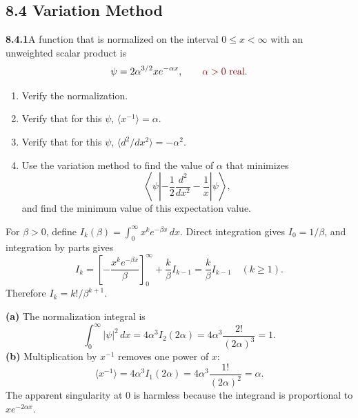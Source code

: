 \subsection*{8.4 Variation Method}

\par\bigskip
\noindent\textbf{8.4.1}\quad A function that is normalized on the interval
$0\le x<\infty$ with an unweighted scalar product is
\[
\psi=2\alpha^{3/2}xe^{-\alpha x},\qquad
\erratum{\alpha>0\ \text{real}}.
\]
\begin{enumerate}
\item[(a)] Verify the normalization.
\item[(b)] Verify that for this $\psi$, $\langle x^{-1}\rangle=\alpha$.
\item[(c)] Verify that for this $\psi$,
  $\langle d^{2}/dx^{2}\rangle=-\alpha^{2}$.
\item[(d)] Use the variation method to find the value of $\alpha$ that
  minimizes
  \[
  \left\langle\psi\left|-\frac{1}{2}\frac{d^{2}}{dx^{2}}-\frac{1}{x}\right|
  \psi\right\rangle,
  \]
  and find the minimum value of this expectation value.
\end{enumerate}
\solution
{}
For $\beta>0$, define $I_k(\beta)=\int_0^\infty x^ke^{-\beta x}\,dx$.
Direct integration gives $I_0=1/\beta$, and integration by parts gives
\[
I_k=\left[-\frac{x^ke^{-\beta x}}\beta\right]_0^\infty
+\frac{k}\beta I_{k-1}=\frac{k}\beta I_{k-1}\quad(k\ge1).
\]
Therefore $I_k=k!/\beta^{k+1}$.

\textbf{(a)} The normalization integral is
\[
\int_0^\infty|\psi|^2\,dx
=4\alpha^3 I_2(2\alpha)
=4\alpha^3\frac{2!}{(2\alpha)^3}=1.
\]
\textbf{(b)} Multiplication by $x^{-1}$ removes one power of $x$:
\[
\boxed{\langle x^{-1}\rangle
=4\alpha^3 I_1(2\alpha)
=4\alpha^3\frac{1!}{(2\alpha)^2}=\alpha}.
\]
The apparent singularity at $0$ is harmless because the integrand is
proportional to $x e^{-2\alpha x}$.

